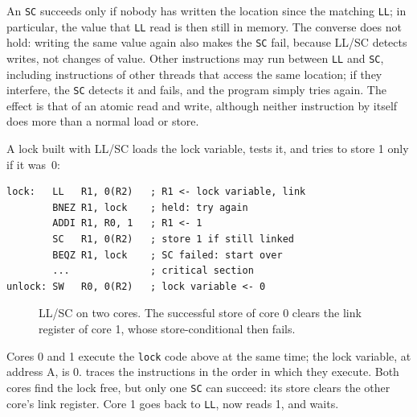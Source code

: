 \documentclass[../main.tex]{subfiles}
\begin{document}
An \texttt{SC} succeeds only if nobody has written the location since the
matching \texttt{LL}; in particular, the value that \texttt{LL} read is then
still in memory.  The converse does not hold: writing the same value again
also makes the \texttt{SC} fail, because LL/SC detects writes, not changes
of value.  Other instructions may run between \texttt{LL} and \texttt{SC},
including instructions of other threads that access the same location; if
they interfere, the \texttt{SC} detects it and fails, and the program simply
tries again.  The effect is that of an atomic read and write, although
neither instruction by itself does more than a normal load or store.

A lock built with LL/SC loads the lock variable, tests it, and tries to
store 1 only if it was~0:
\begin{lstlisting}[language={[x86masm]Assembler}, numbers=none, deletekeywords={lock}]
lock:   LL   R1, 0(R2)   ; R1 <- lock variable, link
        BNEZ R1, lock    ; held: try again
        ADDI R1, R0, 1   ; R1 <- 1
        SC   R1, 0(R2)   ; store 1 if still linked
        BEQZ R1, lock    ; SC failed: start over
        ...              ; critical section
unlock: SW   R0, 0(R2)   ; lock variable <- 0
\end{lstlisting}
\begin{figure}[htbp]
  \centering
  
  \caption{LL/SC on two cores.  The successful store of core 0 clears the
    link register of core 1, whose store-conditional then fails.}
  \label{fig:l20-llsc}
\end{figure}


\begin{example}
  \label{ex:l20-llsc}
  Cores 0 and 1 execute the \texttt{lock} code above at the same time; the
  lock variable, at address A, is 0.   traces the
  instructions in the order in which they execute.  Both cores find the lock
  free, but only one \texttt{SC} can succeed: its store clears the other
  core's link register.  Core 1 goes back to \texttt{LL}, now reads 1, and
  waits.
\end{example}
\end{document}
